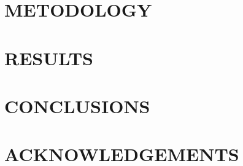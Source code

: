 \documentclass[a4paper,twoside]{article}
\begin{document}
\section{\uppercase{Metodology}}
\label{sec:metodology}

\section{\uppercase{Results}}
\label{sec:results}

\section{\uppercase{Conclusions}}
\label{sec:conclusions}

\section*{\uppercase{Acknowledgements}}
\label{sec:acknowledgements}

\vfill

{\small
}

\vfill
\end{document}

